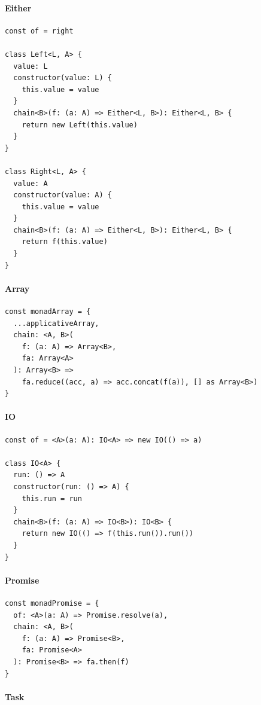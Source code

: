 \documentclass[12pt]{article}
\begin{document}
\paragraph{Either}

\begin{verbatim}
const of = right

class Left<L, A> {
  value: L
  constructor(value: L) {
    this.value = value
  }
  chain<B>(f: (a: A) => Either<L, B>): Either<L, B> {
    return new Left(this.value)
  }
}

class Right<L, A> {
  value: A
  constructor(value: A) {
    this.value = value
  }
  chain<B>(f: (a: A) => Either<L, B>): Either<L, B> {
    return f(this.value)
  }
}
\end{verbatim}

\paragraph{Array}

\begin{verbatim}
const monadArray = {
  ...applicativeArray,
  chain: <A, B>(
    f: (a: A) => Array<B>,
    fa: Array<A>
  ): Array<B> =>
    fa.reduce((acc, a) => acc.concat(f(a)), [] as Array<B>)
}
\end{verbatim}

\paragraph{IO}

\begin{verbatim}
const of = <A>(a: A): IO<A> => new IO(() => a)

class IO<A> {
  run: () => A
  constructor(run: () => A) {
    this.run = run
  }
  chain<B>(f: (a: A) => IO<B>): IO<B> {
    return new IO(() => f(this.run()).run())
  }
}
\end{verbatim}

\paragraph{Promise}

\begin{verbatim}
const monadPromise = {
  of: <A>(a: A) => Promise.resolve(a),
  chain: <A, B>(
    f: (a: A) => Promise<B>,
    fa: Promise<A>
  ): Promise<B> => fa.then(f)
}
\end{verbatim}

\paragraph{Task}
\end{document}

